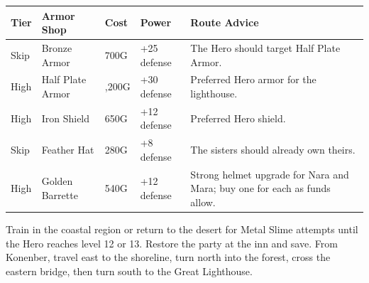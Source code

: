 \documentclass[
  american,
  10pt,
  letterpaper,
  oneside,
  open=any]{scrreprt}
\newcounter{none} %
\newenvironment{guidetable}{%
  \small\setstretch{1.0}%
  \setlength{\tabcolsep}{4pt}%
  \setlength{\LTpre}{8pt}\setlength{\LTpost}{10pt}%
  \renewcommand{\arraystretch}{1.16}%
}{ }
\begin{document}
\begin{guidetable}

{\def\LTcaptype{none} %
\begin{longtable}[]{@{}
  >{\raggedright\arraybackslash}p{}
  >{\raggedright\arraybackslash}p{}
  >{\raggedleft\arraybackslash}p{}
  >{\raggedleft\arraybackslash}p{}
  >{\raggedright\arraybackslash}p{}@{}}
\toprule\noalign{}
\begin{minipage}[b]{\linewidth}\raggedright
\color{GuideGreen}\bfseries Tier
\end{minipage} & \begin{minipage}[b]{\linewidth}\raggedright
\color{GuideGreen}\bfseries Armor Shop
\end{minipage} & \begin{minipage}[b]{\linewidth}\raggedleft
\color{GuideGreen}\bfseries Cost
\end{minipage} & \begin{minipage}[b]{\linewidth}\raggedleft
\color{GuideGreen}\bfseries Power
\end{minipage} & \begin{minipage}[b]{\linewidth}\raggedright
\color{GuideGreen}\bfseries Route Advice
\end{minipage} \\
\midrule\noalign{}
\endhead
\bottomrule\noalign{}
\endlastfoot
Skip & Bronze Armor & 700G & +25 defense & The Hero should target Half
Plate Armor. \\
High & Half Plate Armor & 1,200G & +30 defense & Preferred Hero armor
for the lighthouse. \\
High & Iron Shield & 650G & +12 defense & Preferred Hero shield. \\
Skip & Feather Hat & 280G & +8 defense & The sisters should already own
theirs. \\
High & Golden Barrette & 540G & +12 defense & Strong helmet upgrade for
Nara and Mara; buy one for each as funds allow. \\
\end{longtable}
}

\end{guidetable}

Train in the coastal region or return to the desert for Metal Slime
attempts until the Hero reaches level 12 or 13. Restore the party at the
inn and save. From Konenber, travel east to the shoreline, turn north
into the forest, cross the eastern bridge, then turn south to the Great
Lighthouse.
\end{document}
